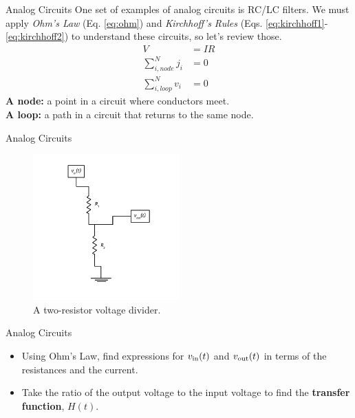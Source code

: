\documentclass{beamer}
\begin{document}
\begin{frame}{Analog Circuits}
One set of examples of analog circuits is RC/LC filters.  We must apply \textit{Ohm's Law} (Eq. \ref{eq:ohm}) and \textit{Kirchhoff's Rules} (Eqs. \ref{eq:kirchhoff1}-\ref{eq:kirchhoff2}) to understand these circuits, so let's review those.
\begin{align}
V &= IR \label{eq:ohm} \\
\sum_{i,node}^N j_i &= 0 \label{eq:kirchhoff1} \\
\sum_{i,loop}^N v_{i} &= 0 \label{eq:kirchhoff2}
\end{align}
\textbf{A node:} a point in a circuit where conductors meet.\\
\textbf{A loop:} a path in a circuit that returns to the same node.
\end{frame}

\begin{frame}{Analog Circuits}
\begin{figure}
\centering
\includegraphics[width=0.5\textwidth]{VoltageDivider.pdf}
\caption{\label{fig:example1} A two-resistor voltage divider.}
\end{figure}
\end{frame}

\begin{frame}{Analog Circuits}
\begin{itemize}
\item Using Ohm's Law, find expressions for $v_{\rm in}(t)$ and $v_{\rm out}(t)$ in terms of the resistances and the current.
\item Take the ratio of the output voltage to the input voltage to find the \textbf{transfer function}, $H(t)$.
\end{itemize}
\end{frame}
\end{document}
